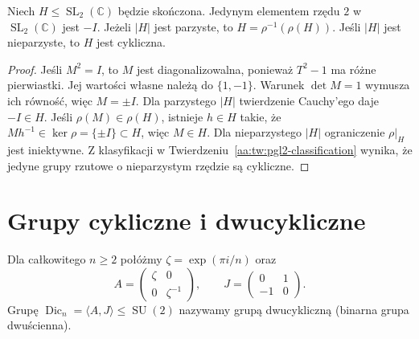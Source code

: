 \begin{lemat}
\label{aa:lem:binary-full-lift}
Niech $H\le\operatorname{SL}_2(\mathbb C)$ będzie skończona.
Jedynym elementem rzędu $2$ w $\operatorname{SL}_2(\mathbb C)$
jest $-I$. Jeżeli $|H|$ jest parzyste, to
$H=\rho^{-1}(\rho(H))$. Jeśli $|H|$ jest nieparzyste,
to $H$ jest cykliczna.
\end{lemat}
\begin{proof}
Jeśli $M^2=I$, to $M$ jest diagonalizowalna, ponieważ
$T^2-1$ ma różne pierwiastki. Jej wartości własne
należą do $\{1,-1\}$. Warunek $\det M=1$ wymusza
ich równość, więc $M=\pm I$.
Dla parzystego $|H|$ twierdzenie Cauchy'ego daje $-I\in H$.
Jeśli $\rho(M)\in\rho(H)$, istnieje $h\in H$ takie, że
$Mh^{-1}\in\ker\rho=\{\pm I\}\subset H$,
więc $M\in H$.
Dla nieparzystego $|H|$ ograniczenie $\rho|_H$ jest
iniektywne. Z klasyfikacji w
Twierdzeniu~\ref{aa:tw:pgl2-classification} wynika,
że jedyne grupy rzutowe o nieparzystym rzędzie są cykliczne.
\end{proof}

\section{Grupy cykliczne i dwucykliczne}

\begin{definicja}
\label{aa:def:binary-dicyclic}
Dla całkowitego $n\ge2$ połóżmy
$\zeta=\exp(\pi i/n)$ oraz
\[
 A=\begin{pmatrix}\zeta&0\\0&\zeta^{-1}\end{pmatrix},
 \qquad J=\begin{pmatrix}0&1\\-1&0\end{pmatrix}.
\]
Grupę $\operatorname{Dic}_n=\langle A,J\rangle
\le\operatorname{SU}(2)$ nazywamy grupą dwucykliczną
(binarna grupa dwuścienna).
\end{definicja}

